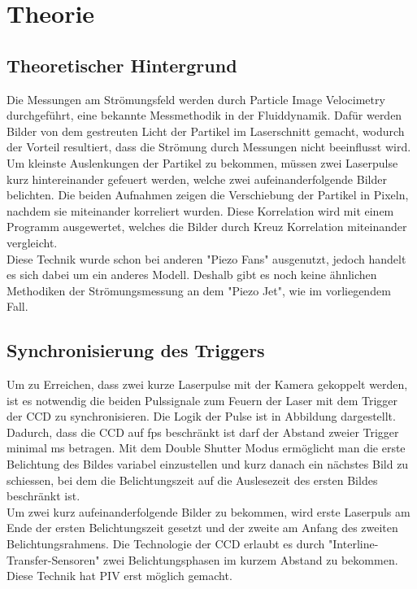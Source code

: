 \section{Theorie}
\subsection{Theoretischer Hintergrund}
Die Messungen am Strömungsfeld werden durch Particle Image Velocimetry durchgeführt, eine bekannte Messmethodik in der Fluiddynamik. Dafür werden Bilder von dem gestreuten Licht der Partikel im Laserschnitt gemacht, wodurch der Vorteil resultiert, dass die Strömung durch Messungen nicht beeinflusst wird. Um kleinste Auslenkungen der Partikel zu bekommen, müssen zwei Laserpulse kurz hintereinander gefeuert werden, welche zwei aufeinanderfolgende Bilder belichten. Die beiden Aufnahmen zeigen die Verschiebung der Partikel in Pixeln, nachdem sie miteinander korreliert wurden. Diese Korrelation wird mit einem Programm ausgewertet, welches die Bilder durch Kreuz Korrelation miteinander vergleicht.\\
Diese Technik wurde schon bei anderen "Piezo Fans" ausgenutzt, jedoch handelt es sich dabei um ein anderes Modell. Deshalb gibt es noch keine ähnlichen Methodiken der Strömungsmessung an dem "Piezo Jet", wie im vorliegendem Fall.
\subsection{Synchronisierung des Triggers}
Um zu Erreichen, dass zwei kurze Laserpulse mit der Kamera gekoppelt werden, ist es notwendig die beiden Pulssignale zum Feuern der Laser mit dem Trigger der CCD zu synchronisieren. Die Logik der Pulse ist in Abbildung dargestellt.\\
Dadurch, dass die CCD auf fps beschränkt ist darf der Abstand zweier Trigger minimal ms betragen. Mit dem Double Shutter Modus ermöglicht man die erste Belichtung des Bildes variabel einzustellen und kurz danach ein nächstes Bild zu schiessen, bei dem die Belichtungszeit auf die Auslesezeit des ersten Bildes beschränkt ist.\\
Um zwei kurz aufeinanderfolgende Bilder zu bekommen, wird erste Laserpuls am Ende der ersten Belichtungszeit gesetzt und der zweite am Anfang des zweiten Belichtungsrahmens. Die Technologie der CCD erlaubt es durch "Interline-Transfer-Sensoren" zwei Belichtungsphasen im kurzem Abstand zu bekommen. Diese Technik hat PIV erst möglich gemacht.\\
